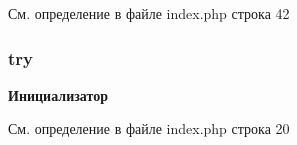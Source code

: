 См. определение в файле index.\-php строка 42

\hypertarget{index_8php_abe4cc9788f52e49485473dc699537388}{
\subsubsection[{try}]{\setlength{\rightskip}{0pt plus 5cm}try}}\label{index_8php_abe4cc9788f52e49485473dc699537388}
{\bfseries Инициализатор}


См. определение в файле index.\-php строка 20

